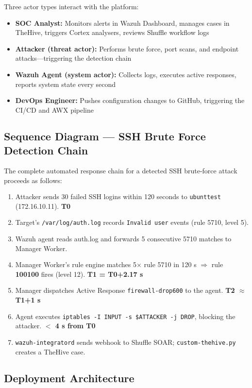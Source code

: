 \documentclass[12pt,a4paper]{report}
\begin{document}
Three actor types interact with the platform:

\begin{itemize}
  \item \textbf{SOC Analyst:} Monitors alerts in Wazuh Dashboard, manages cases in TheHive, triggers Cortex analysers, reviews Shuffle workflow logs
  \item \textbf{Attacker (threat actor):} Performs brute force, port scans, and endpoint attacks---triggering the detection chain
  \item \textbf{Wazuh Agent (system actor):} Collects logs, executes active responses, reports system state every second
  \item \textbf{DevOps Engineer:} Pushes configuration changes to GitHub, triggering the CI/CD and AWX pipeline
\end{itemize}

\subsection{Sequence Diagram --- SSH Brute Force Detection Chain}

The complete automated response chain for a detected SSH brute-force attack proceeds as follows:

\begin{enumerate}
  \item Attacker sends 30 failed SSH logins within 120 seconds to \texttt{ubunttest} (172.16.10.11). \quad \textbf{T0}
  \item Target's \texttt{/var/log/auth.log} records \texttt{Invalid user} events (rule 5710, level 5).
  \item Wazuh agent reads auth.log and forwards 5 consecutive 5710 matches to Manager Worker.
  \item Manager Worker's rule engine matches 5$\times$ rule 5710 in 120 s $\Rightarrow$ rule \textbf{100100} fires (level 12). \quad \textbf{T1 = T0+2.17 s}
  \item Manager dispatches Active Response \texttt{firewall-drop600} to the agent. \quad \textbf{T2 $\approx$ T1+1 s}
  \item Agent executes \texttt{iptables -I INPUT -s \$ATTACKER -j DROP}, blocking the attacker. \quad \textbf{$<$ 4 s from T0}
  \item \texttt{wazuh-integratord} sends webhook to Shuffle SOAR; \texttt{custom-thehive.py} creates a TheHive case.
\end{enumerate}

\subsection{Deployment Architecture}
\end{document}
